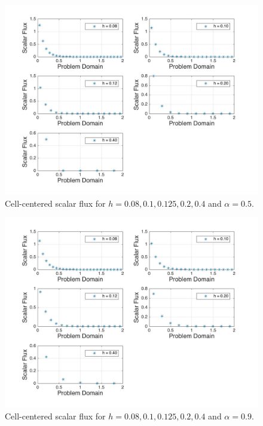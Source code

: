 \documentclass[10pt]{article}
\begin{document}
\begin{figure}[H]
  \centering
  \includegraphics[width=16cm]{ScalarFlux250.jpg} %
  \caption{Cell-centered scalar flux for \(h=0.08, 0.1, 0.125, 0.2, 0.4\) and \(\alpha=0.5\).}
\end{figure}

\begin{figure}[H]
  \centering
  \includegraphics[width=16cm]{ScalarFlux290.jpg} %
  \caption{Cell-centered scalar flux for \(h=0.08, 0.1, 0.125, 0.2, 0.4\) and \(\alpha=0.9\).}
\end{figure}
\end{document}
